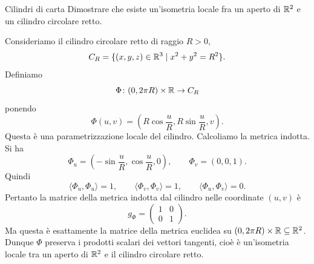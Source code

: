\documentclass[a4paper]{article}
\begin{document}
\begin{snippetexercise}{Cilindri di carta}
    Dimostrare che esiste un'isometria locale fra un aperto di
    \(\mathbb{R}^2\) e un cilindro circolare retto.
\end{snippetexercise}

\begin{snippetsolution}{}
    Consideriamo il cilindro circolare retto di raggio \(R>0\),
    \[
        C_R=\{(x,y,z)\in\mathbb{R}^3\mid x^2+y^2=R^2\}.
    \]
    Definiamo
    \[
        \Phi\colon(0,2\pi R)\times\mathbb{R}\to C_R
    \]
    ponendo
    \[
        \Phi(u,v)=
        \left(
            R\cos\frac{u}{R},
            R\sin\frac{u}{R},
            v
        \right).
    \]
    Questa è una parametrizzazione locale del cilindro. Calcoliamo la metrica indotta. Si ha
    \[
        \Phi_u=
        \left(
            -\sin\frac{u}{R},
            \cos\frac{u}{R},
            0
        \right),
        \qquad
        \Phi_v=(0,0,1).
    \]
    Quindi
    \[
        \langle\Phi_u,\Phi_u\rangle=1,
        \qquad
        \langle\Phi_v,\Phi_v\rangle=1,
        \qquad
        \langle\Phi_u,\Phi_v\rangle=0.
    \]
    Pertanto la matrice della metrica indotta dal cilindro nelle coordinate \((u,v)\) è
    \[
        g_\Phi=
        \begin{pmatrix}
            1 & 0\\
            0 & 1
        \end{pmatrix}.
    \]
    Ma questa è esattamente la matrice della metrica euclidea su \((0,2\pi R)\times\mathbb{R}\subseteq\mathbb{R}^2\). Dunque \(\Phi\) preserva i prodotti scalari dei vettori tangenti, cioè è un'isometria locale tra un aperto di \(\mathbb{R}^2\) e il cilindro circolare retto.
\end{snippetsolution}
\end{document}
